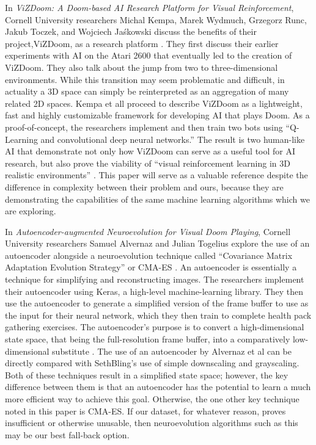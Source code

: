 In {\it ViZDoom: A Doom-based AI Research Platform for Visual Reinforcement}, Cornell University researchers Michal Kempa, Marek Wydmuch, Grzegorz Runc, Jakub Toczek, and Wojciech Jaśkowski discuss the benefits of their project,ViZDoom, as a research platform \cite{Kempka:2016}. They first discuss their earlier experiments with AI on the Atari 2600 that eventually led to the creation of ViZDoom. They also talk about the jump from two to three-dimensional environments. While this transition may seem problematic and difficult, in actuality a 3D space can simply be reinterpreted as an aggregation of many related 2D spaces. Kempa et all proceed to describe ViZDoom as a lightweight, fast and highly customizable framework for developing AI that plays Doom. As a proof-of-concept, the researchers implement and then train two bots using ``Q-Learning and convolutional deep neural networks.'' The result is two human-like AI that demonstrate not only how ViZDoom can serve as a useful tool for AI research, but also prove the viability of ``visual reinforcement learning in 3D realistic environments'' \cite{Kempka:2016}. This paper will serve as a valuable reference despite the difference in complexity between their problem and ours, because they are demonstrating the capabilities of the same machine learning algorithms which we are exploring.

In {\it Autoencoder-augmented Neuroevolution for Visual Doom Playing}, Cornell University researchers Samuel Alvernaz and Julian Togelius explore the use of an autoencoder alongside a neuroevolution technique called ``Covariance Matrix Adaptation Evolution Strategy'' or CMA-ES \cite{Alvernaz:2017}. An autoencoder is essentially a technique for simplifying and reconstructing images. The researchers implement their autoencoder using Keras, a high-level machine-learning library. They then use the autoencoder to generate a simplified version of the frame buffer to use as the input for their neural network, which they then train to complete health pack gathering exercises. The autoencoder's purpose is to convert a high-dimensional state space, that being the full-resolution frame buffer, into a comparatively low-dimensional substitute \cite{Alvernaz:2017}. The use of an autoencoder by Alvernaz et al can be directly compared with SethBling's use of simple downscaling and grayscaling. Both of these techniques result in a simplified state space; however, the key difference between them is that an autoencoder has the potential to learn a much more efficient way to achieve this goal. Otherwise, the one other key technique noted in this paper is CMA-ES. If our dataset, for whatever reason, proves insufficient or otherwise unusable, then neuroevolution algorithms such as this may be our best fall-back option.

